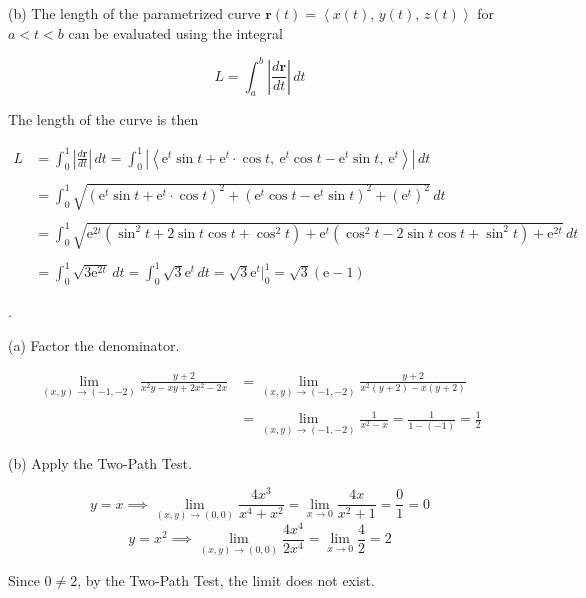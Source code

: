 \documentclass{article}
\begin{document}
\hfill

\noindent (b) The length of the parametrized curve $\mathbf{r}(t)=\left\langle x(t),\,y(t),\,z(t)\right\rangle$ for $a<t<b$ can be evaluated using the integral

\[L=\int_a^b\left|\frac{d\mathbf r}{dt}\right|\,dt\]

\hfill

\noindent The length of the curve is then

\begin{align*}L&=\int_0^1\left|\frac{d\mathbf r}{dt}\right|\,dt=\int_0^1\left|\left\langle\mathrm{e}^t\sin t+\mathrm{e}^t\cdot\cos t,\:\mathrm{e}^t\cos t-\mathrm{e}^t\sin t,\:\mathrm{e}^t\right\rangle\right|\,dt\\\\&=\int_0^1\sqrt{\left(\mathrm{e}^t\sin t+\mathrm{e}^t\cdot\cos t\right)^2+\left(\mathrm{e}^t\cos t-\mathrm{e}^t\sin t\right)^2+\left(\mathrm{e}^t\right)^2}\,dt\\\\&=\int_0^1\sqrt{\mathrm{e}^{2t}\left(\sin^2t+2\sin t\cos t+\cos^2t\right)+\mathrm{e}^t\left(\cos^2t-2\sin t\cos t+\sin^2t\right)+\mathrm{e}^{2t}}\,dt\\\\&=\int_0^1\sqrt{3\mathrm{e}^{2t}}\,dt=\int_0^1\sqrt3\mathrm e^t\,dt=\sqrt3\mathrm{e}^t\bigg|_0^1=\boxed{\sqrt3(\mathrm e-1)}\end{align*}

\hfill

.

\hfill

\noindent (a) Factor the denominator.

\begin{align*}\lim_{(x,y)\to(-1,-2)}\frac{y+2}{x^2y-xy+2x^2-2x}&=\lim_{(x,y)\to(-1,-2)}\frac{y+2}{x^2(y+2)-x(y+2)}\\\\&=\lim_{(x,y)\to(-1,-2)}\frac1{x^2-x}=\frac1{1-(-1)}=\boxed{\frac12}\end{align*}

\hfill

\noindent (b) Apply the Two-Path Test.

\[y=x\implies\lim_{(x,y)\to(0,0)}\frac{4x^3}{x^4+x^2}=\lim_{x\to0}\frac{4x}{x^2+1}=\frac01=0\]
\[y=x^2\implies\lim_{(x,y)\to(0,0)}\frac{4x^4}{2x^4}=\lim_{x\to0}\frac42=2\]

\hfill

\noindent Since $0\neq2$, by the Two-Path Test, the limit does not exist.
\end{document}
